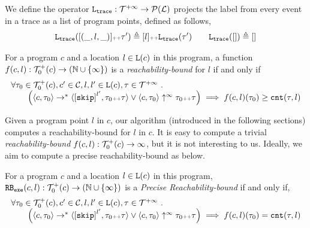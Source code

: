 %
We define the operator $\mathtt{L}_{\mathtt{{trace}}} : \mathcal{T}^{+\infty} \to \mathcal{P}{(\mathcal{L})}$ projects the label from every event in a trace as a list of program points,
defined as follows,
\[
\mathtt{L}_{\mathtt{{trace}}}([(\_, l, \_)] {\scriptscriptstyle ++} \mathtt{\tau}') \triangleq [l] {\scriptscriptstyle ++} \mathtt{L}_{\mathtt{{trace}}}(\mathtt{\tau}')
\qquad
\mathtt{L}_{\mathtt{{trace}}}([ ]) \triangleq []
\]
%
\begin{defn}
 \label{def:rb}
 For a program ${c}$ and a location $l \in \mathtt{L}(c)$ in this program,
a function $f(c, l) : \mathcal{T}^{+}_0(c) \to (\mathbb{N} \cup \{\infty\})$ is a \emph{reachability-bound} for $l$ if and only if
\[
 \begin{array}{l}
 \forall \trace_0 \in \ftdom_0(c), c' \in \cdom, l, l' \in \progl(c), \trace \in \tdom \sthat 
 \\ \qquad
 \Big(
 \config{{c}, \trace_0} \to^{*} \config{\clabel{\eskip}^{l'}, \trace_0 \tracecat \trace} 
 \lor 
 \config{{c}, \trace_0} \uparrow^{\infty} \trace_0 \tracecat \trace 
 \Big)
 \implies f({c}, l)(\trace_0) \geq \counter(\trace, l) 
 \end{array}
 \]
\end{defn}
Given a program point $l$ in $c$, our algorithm (introduced in the following sections) computes a reachability-bound for $l$ in $c$.
It is easy to compute a trivial \emph{reachability-bound} $f(c, l): \mathcal{T}^{+}_0(c) \to \infty$, but it is not interesting to us.
Ideally, we aim to compute a precise reachability-bound as below.

\begin{defn}
 \label{def:exe_rb}
 For a program ${c}$ and a location $l \in \mathtt{L}(c)$ in this program,
$\mathtt{RB_{exe}}({c}, l): \mathcal{T}^{+}_0(c) \to (\mathbb{N} \cup \{\infty\})$ is a \emph{Precise Reachability-bound} if and only if,
\[
 \begin{array}{l}
 \forall \trace_0 \in \ftdom_0(c), c' \in \cdom, l, l' \in \progl(c), \trace \in \tdom \sthat 
 \\ \qquad
 \Big(
 \config{{c}, \trace_0} \to^{*} \config{\clabel{\eskip}^{l'}, \trace_0 \tracecat \trace} 
 \lor 
 \config{{c}, \trace_0} \uparrow^{\infty} \trace_0 \tracecat \trace 
 \Big)
 \implies f({c}, l)(\trace_0) = \counter(\trace, l) 
 \end{array}
 \]
\end{defn}

